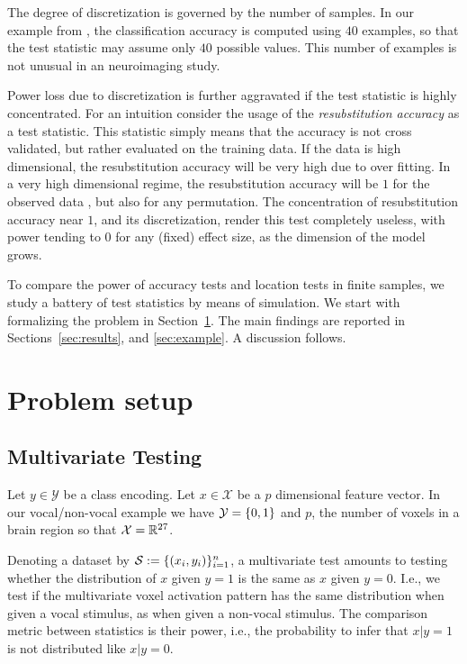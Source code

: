\documentclass[12pt,a4paper]{article}
\begin{document}
The degree of discretization is governed by the number of samples. 
In our example from \citet{gilron_quantifying_2016}, the classification accuracy is computed using $40$ examples, so that the test statistic may assume only $40$ possible values. 
This number of examples is not unusual in an neuroimaging study. 

Power loss due to discretization is further aggravated if the test statistic is highly concentrated. 
For an intuition consider the usage of the \emph{resubstitution accuracy} as a test statistic. 
This statistic simply means that the accuracy is not cross validated, but rather evaluated on the training data.
If the data is high dimensional, the resubstitution accuracy will be very high due to over fitting. 
In a very high dimensional regime, the resubstitution accuracy will be $1$ for the observed data \cite[Theorem 1]{mclachlan_bias_1976}, but also for any permutation.
The concentration of resubstitution accuracy near $1$, and its discretization, render this test completely useless, with power tending to $0$ for any (fixed) effect size, as the dimension of the model grows. 


To compare the power of accuracy tests and location tests in finite samples, we study a battery of test statistics by means of simulation. 
We start with formalizing the problem in Section~\ref{sec:problem_setup}.
The main findings are reported in Sections~\ref{sec:results}, and \ref{sec:example}.
A discussion follows. 



\section{Problem setup}
\label{sec:problem_setup}


\subsection{Multivariate Testing}

Let $y \in \mathcal{Y}$ be a class encoding. 
Let $x \in \mathcal{X}$ be a $p$ dimensional feature vector. 
In our vocal/non-vocal example we have $\mathcal{Y}=\{ 0,1 \}$ and $p$, the number of voxels in a brain region so that $\mathcal{X}=\mathbb{R}^{27}$. 

Denoting a dataset by $\mathcal{S}:=\{(x_i,y_i)\}_{i=1}^n$, a multivariate test amounts to testing whether the distribution of $x$ given $y=1$ is the same as $x$ given $y=0$. 
I.e., we test if the multivariate voxel activation pattern has the same distribution when given a vocal stimulus, as when given a non-vocal stimulus. 
The comparison metric between statistics is their power, i.e., the probability to infer that $x|y=1$ is not distributed like $x|y=0$.
\end{document}
